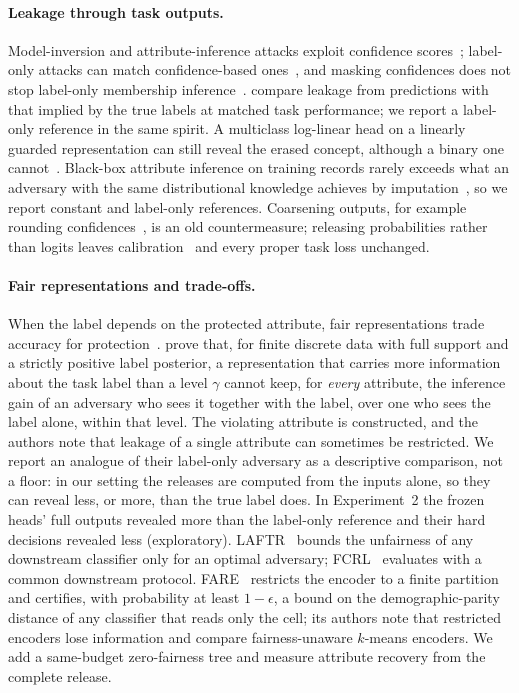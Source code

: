 \documentclass[10pt]{article}
\begin{document}
\paragraph{Leakage through task outputs.} Model-inversion and attribute-inference attacks exploit confidence
scores~\citep{fredrikson2014pharmacogenetics,fredrikson2015model}; label-only attacks can match confidence-based
ones~\citep{mehnaz2022sensitive}, and masking confidences does not stop label-only membership
inference~\citep{choquettechoo2021label}. \citet{wang2019balanced} compare leakage from predictions with that implied
by the true labels at matched task performance; we report a label-only reference in the same spirit. A multiclass
log-linear head on a linearly guarded representation can still reveal the erased concept, although a binary one
cannot~\citep{ravfogel2023loglinear}. Black-box attribute inference on training records rarely
exceeds what an adversary with the same distributional knowledge achieves by imputation~\citep{jayaraman2022imputation},
so we report constant and label-only references. Coarsening outputs, for
example rounding confidences~\citep{fredrikson2015model}, is an old countermeasure; releasing probabilities rather than
logits leaves calibration~\citep{guo2017calibration} and every proper task loss unchanged.

\paragraph{Fair representations and trade-offs.} When the label depends on the protected attribute, fair
representations trade accuracy for protection~\citep{zhao2019inherent,zhao2022inherent}.
\citet{stadler2024lpl} prove that, for finite discrete data with full support and a strictly positive label posterior,
a representation that carries more information about the task label than a level $\gamma$ cannot keep, for
\emph{every} attribute, the inference gain of an adversary who sees it together with the label, over one who sees the
label alone, within that level. The violating attribute is constructed, and the authors note that leakage of a single
attribute can sometimes be restricted. We report an analogue of their label-only adversary as a descriptive comparison,
not a floor: in our setting the releases are computed from the inputs alone, so they can reveal less, or more, than the
true label does. In Experiment~2 the frozen heads' full outputs revealed more than the label-only reference and their
hard decisions revealed less (exploratory). LAFTR~\citep{madras2018laftr} bounds the unfairness of any downstream classifier only for an optimal adversary; FCRL~\citep{gupta2021fcrl} evaluates with a common downstream protocol. FARE~\citep{jovanovic2023fare}
restricts the encoder to a finite partition and certifies, with probability at least $1-\epsilon$, a bound on the
demographic-parity distance of any classifier that reads only the cell; its authors note that restricted encoders lose information and compare fairness-unaware $k$-means
encoders. We add a same-budget zero-fairness tree and measure attribute recovery from the complete release.
\end{document}
